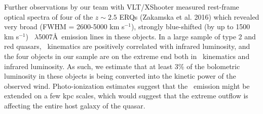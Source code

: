 \vspace{-22pt}
\fi

\smallskip
\smallskip
\noindent
Further observations by our team with VLT/XShooter measured rest-frame
optical spectra of four of the $z\sim 2.5$ ERQs (Zakamska et al. 2016)
which revealed very broad (FWHM = 2600-5000 km s$^{-1}$), strongly
blue-shifted (by up to 1500 km s$^{-1}$) \oiii\ $\lambda$5007\AA\
emission lines in these objects. In a large sample of type 2 and red
quasars, \oiii\ kinematics are positively correlated with infrared
luminosity, and the four objects in our sample are on the extreme end
both in \oiii\ kinematics and infrared luminosity.  As such, we
estimate that at least 3\% of the bolometric luminosity in these
objects is being converted into the kinetic power of the observed
wind. Photo-ionization estimates suggest that the \oiii\ emission
might be extended on a few kpc scales, which would suggest that the
extreme outflow is affecting the entire host galaxy of the quasar.

